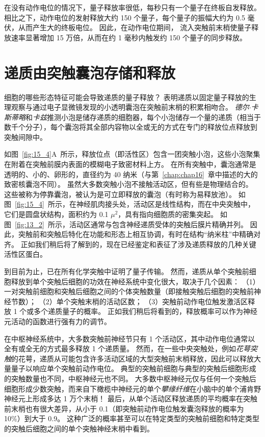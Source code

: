 在没有动作电位的情况下，量子释放率很低，每秒只有一个量子在终板自发释放。
相比之下，动作电位的发射释放大约 150 个量子，每个量子的振幅大约为 0.5 毫伏，从而产生大的终板电位。
因此，在动作电位期间， 流入突触前末梢使量子释放速率显著增加 15 万倍，从而在约 1 毫秒内触发约 150 个量子的同步释放。



\section{递质由突触囊泡存储和释放}

细胞的哪些形态特征可能会导致递质的量子释放？
表明递质以固定量子释放的生理观察与通过电子显微镜发现的小透明囊泡在突触前末梢的积累相吻合。
\textit{德尔$\cdot$卡斯蒂略}和\textit{卡兹}推测小泡是储存递质的细胞器，每个小泡储存一个量的递质（相当于数千个分子），每个囊泡将其全部内容物以全或无的方式在专门的释放位点释放到突触间隙中。


如图~\ref{fig:15_4}A~所示，释放位点（即活性区）包含一团突触小泡，这些小泡聚集在附着在突触前膜内表面的模糊电子致密材料上方。
在所有突触中，囊泡通常是透明的、小的、卵形的，直径约为 40 纳米（与第~\ref{chap:chap16}~章中描述的大的致密核囊泡不同）。
虽然大多数突触小泡不接触活动区，但有些是物理结合的。
这些被称为停靠囊泡，被认为是可立即释放的囊泡（有时称为易释放池）。
如图~\ref{fig:15_4}~所示，在神经肌肉接头处，活动区是线性结构，而在中央突触中，它们是圆盘状结构，面积约为 0.1 $ \mu^2 $，具有指向细胞质的密集突起。
如图~\ref{fig:13_2}~所示，活动区通常与包含神经递质受体的突触后膜片精确并列。
因此，突触前和突触后特化在功能和形态上相互协调，有时在结构“纳米柱”中精确对齐。 
正如我们稍后将了解到的，现在已经鉴定和表征了涉及递质释放的几种关键活性区蛋白。


到目前为止，已在所有化学突触中证明了量子传输。
然而，递质从单个突触前细胞释放到单个突触后细胞的功效在神经系统中变化很大，取决于几个因素：
（1）一对突触前细胞和突触后细胞之间的个体突触数量（即接触突触后细胞的突触前神经节数）；
（2）单个突触末梢的活动区数；
（3）突触前动作电位触发激活区释放 1 个或多个递质量子的概率。
正如我们稍后将看到的，释放概率可以作为神经元活动的函数进行强有力的调节。


在中枢神经系统中，大多数突触前神经节只有 1 个活动区，其中动作电位通常以全有或全无的方式最多释放 1 个递质量。
然而，在一些中央突触处，例如\textit{花萼突触}的花萼，递质从可能包含许多活动区域的大型突触前末梢释放，因此可以释放大量量子以响应单个突触前动作电位。
典型的突触前细胞与典型的突触后细胞形成的突触数量也不同，中枢神经元也不同。
大多数中枢神经元仅与任何一个突触后细胞形成少数突触，而来自下橄榄中神经元的单个\textit{攀缘纤维}在小脑中的单个浦肯野神经元上形成多达 1 万个末梢！
最后，从单个活动区释放递质的平均概率在突触前末梢也有很大差异，从小于 0.1（即突触前动作电位触发囊泡释放的概率为 10\%）到大于 0.9。
这种广泛的概率甚至可以在特定类型的突触前细胞和特定类型的突触后细胞之间的单个突触神经末梢中看到。


